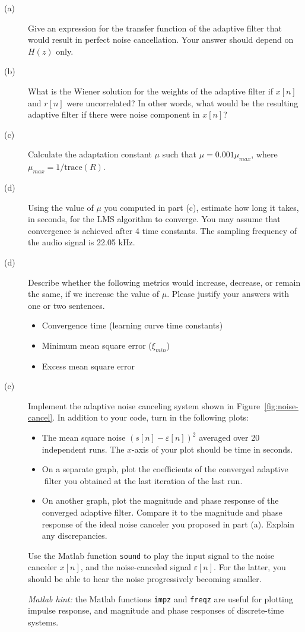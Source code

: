\documentclass[12pt]{report}
\begin{document}
\begin{description}
	\item [(a)] Give an expression for the transfer function of the adaptive filter that would result in perfect noise cancellation. Your answer should depend on $H(z)$ only.
	\item [(b)] What is the Wiener solution for the weights of the adaptive filter if $x[n]$ and $r[n]$ were uncorrelated? In other words, what would be the resulting adaptive filter if there were noise component in $x[n]$?
	\item [(c)] Calculate the adaptation constant $\mu$ such that $\mu = 0.001\mu_{max}$, where $\mu_{max} = 1/\mathrm{trace}(R)$.
	\item [(d)] Using the value of $\mu$ you computed in part (c), estimate how long it takes, in seconds, for the LMS algorithm to converge. You may assume that convergence is achieved after 4 time constants. The sampling frequency of the audio signal is 22.05 kHz. 
	\item [(d)] Describe whether the following metrics would increase, decrease, or remain the same, if we increase the value of $\mu$. Please justify your answers with one or two sentences.
	\begin{itemize}
		\item Convergence time (learning curve time constants)
		\item Minimum mean square error ($\xi_{min}$)
		\item Excess mean square error
	\end{itemize}
	\item [(e)] Implement the adaptive noise canceling system shown in Figure~\ref{fig:noise-cancel}. In addition to your code, turn in the following plots: 
	\begin{itemize}
		\item The mean square noise $(s[n] - \varepsilon[n])^2$ averaged over 20 independent runs. The $x$-axis of your plot should be time in seconds.
		\item On a separate graph, plot the coefficients of the converged adaptive filter you obtained at the last iteration of the last run.
		\item On another graph, plot the magnitude and phase response of the converged adaptive filter. Compare it to the magnitude and phase response of the ideal noise canceler you proposed in part (a). Explain any discrepancies.
	\end{itemize}

	Use the Matlab function \texttt{sound} to play the input signal to the noise canceler $x[n]$, and the noise-canceled signal $\varepsilon[n]$. For the latter, you should be able to hear the noise progressively becoming smaller.
	
	\textit{Matlab hint:} the Matlab functions \texttt{impz} and \texttt{freqz} are useful for plotting impulse response, and magnitude and phase responses of discrete-time systems.
	
\end{description}
\end{document}
